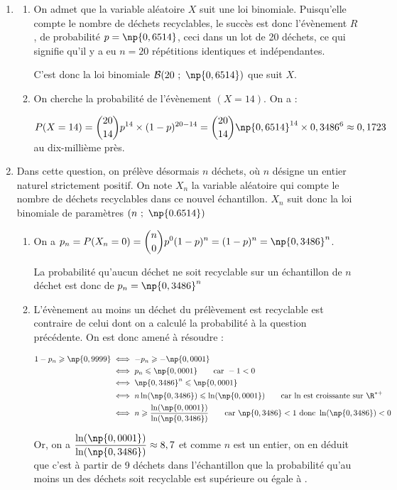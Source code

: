 \begin{enumerate}
\item
	\begin{enumerate}
		\item On admet que la variable aléatoire $X$ suit une loi binomiale. Puisqu'elle compte le nombre de déchets recyclables, le succès est donc l'évènement $R$, de probabilité $p = \np{0,6514}$, ceci dans un lot de 20 déchets, ce qui signifie qu'il y a eu $n = 20$ répétitions identiques et indépendantes.

C'est donc la loi binomiale $\mathcal{B}(20~;~\np{0,6514})$ que suit $X$.

		\item On cherche la probabilité de l'évènement $(X = 14)$. On a :

$P(X=14) = \displaystyle \binom{20}{14} p^{14}\times (1-p)^{20 - 14} = \binom{20}{14} \np{0,6514}^{14}\times 0,3486^{6} \approx 0,1723$ au dix-millième près.
	\end{enumerate}
\item Dans cette question, on prélève désormais $n$ déchets, où $n$ désigne un entier naturel strictement positif. On note $X_n$ la variable aléatoire qui compte le nombre de déchets recyclables dans ce nouvel échantillon. $X_n$ suit donc la loi binomiale de paramètres $(n~;~\np{0.6514})$
	\begin{enumerate}
		\item On a $p_{n} = P(X_n = 0) = \displaystyle \binom{n}{0} p^0 (1 - p)^{n} = (1 - p)^n = \np{0,3486}^n$.

La probabilité qu'aucun déchet ne soit recyclable sur un échantillon de $n$ déchet est donc de $p_n = \np{0,3486}^n$

		\item L'évènement \og au moins un déchet du prélèvement est recyclable \fg{} est contraire de celui dont on a calculé la probabilité à la question précédente. On est donc amené à résoudre :

$\begin{aligned} 1 - p_n \geqslant \np{0,9999} &\iff -p_n \geqslant -\np{0,0001}\\
&\iff p_n \leqslant \np{0,0001} \qquad \text{car }-1<0\\
&\iff \np{0,3486}^n \leqslant \np{0,0001}\\
&\iff n \ln(\np{0,3486}) \leqslant \ln(\np{0,0001}) \qquad \text{car ln est croissante sur } \R^{*+}\\
&\iff n \geqslant \dfrac{\ln(\np{0,0001})}{\ln(\np{0,3486})} \qquad \text{car } \np{0,3486}<1 \text{ donc } \ln(\np{0,3486})<0
\\ \end{aligned}$

Or, on a $\dfrac{\ln(\np{0,0001})}{\ln(\np{0,3486})} \approx 8,7$ et comme $n$ est un entier, on en déduit que c'est à partir de 9 déchets dans l'échantillon que la probabilité qu'au moins un des déchets soit recyclable est supérieure ou égale à .
	\end{enumerate}
\end{enumerate}

\bigskip

